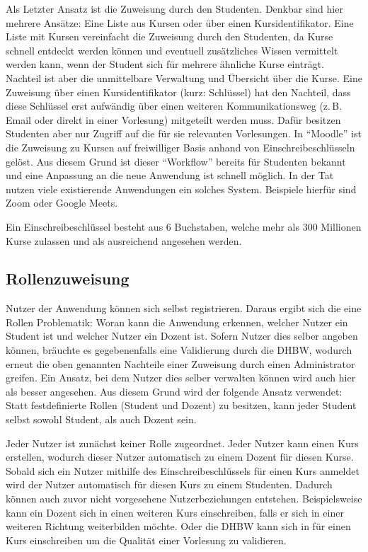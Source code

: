 Als Letzter Ansatz ist die Zuweisung durch den Studenten.
Denkbar sind hier mehrere Ansätze: Eine Liste aus Kursen oder über einen Kursidentifikator.
Eine Liste mit Kursen vereinfacht die Zuweisung durch den Studenten, da Kurse schnell entdeckt werden können und eventuell zusätzliches Wissen vermittelt werden kann, wenn der Student sich für mehrere ähnliche Kurse einträgt.
Nachteil ist aber die unmittelbare Verwaltung und Übersicht über die Kurse.
Eine Zuweisung über einen Kursidentifikator (kurz: Schlüssel) hat den Nachteil, dass diese Schlüssel erst aufwändig über einen weiteren Kommunikationsweg (z.\,B. Email oder direkt in einer Vorlesung) mitgeteilt werden muss.
Dafür besitzen Studenten aber nur Zugriff auf die für sie relevanten Vorlesungen.
In \enquote{Moodle} ist die Zuweisung zu Kursen auf freiwilliger Basis anhand von Einschreibeschlüsseln gelöst.
Aus diesem Grund ist dieser \enquote{Workflow} bereits für Studenten bekannt und eine Anpassung an die neue Anwendung ist schnell möglich.
In der Tat nutzen viele existierende Anwendungen ein solches System.
Beispiele hierfür sind Zoom oder Google Meets.

Ein Einschreibeschlüssel besteht aus 6 Buchstaben, welche mehr als 300 Millionen Kurse zulassen und als ausreichend angesehen werden.


\subsection{Rollenzuweisung} %
Nutzer der Anwendung können sich selbst registrieren.
Daraus ergibt sich die eine Rollen Problematik: Woran kann die Anwendung erkennen, welcher Nutzer ein Student ist und welcher Nutzer ein Dozent ist.
Sofern Nutzer dies selber angeben können, bräuchte es gegebenenfalls eine Validierung durch die DHBW, wodurch erneut die oben genannten Nachteile einer Zuweisung durch einen Administrator greifen.
Ein Ansatz, bei dem Nutzer dies selber verwalten können wird auch hier als besser angesehen.
Aus diesem Grund wird der folgende Ansatz verwendet:
Statt festdefinierte Rollen (Student und Dozent) zu besitzen, kann jeder Student selbst sowohl Student, als auch Dozent sein.

Jeder Nutzer ist zunächst keiner Rolle zugeordnet.
Jeder Nutzer kann einen Kurs erstellen, wodurch dieser Nutzer automatisch zu einem Dozent für diesen Kurse.
Sobald sich ein Nutzer mithilfe des Einschreibeschlüssels für einen Kurs anmeldet wird der Nutzer automatisch für diesen Kurs zu einem Studenten.
Dadurch können auch zuvor nicht vorgesehene Nutzerbeziehungen entstehen.
Beispielsweise kann ein Dozent sich in einen weiteren Kurs einschreiben, falls er sich in einer weiteren Richtung weiterbilden möchte.
Oder die DHBW kann sich in für einen Kurs einschreiben um die Qualität einer Vorlesung zu validieren.


